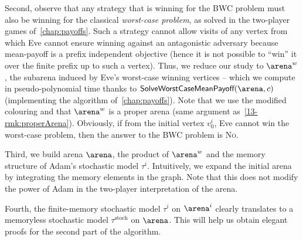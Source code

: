 Second, observe that any strategy that is winning for the BWC problem must also be winning for the classical \textit{worst-case problem}, as solved in the two-player games of~\cref{chap:payoffs}. Such a strategy cannot allow visits of any vertex from which Eve cannot ensure winning against an antagonistic adversary because mean-payoff is a prefix independent objective (hence it is not possible to ``win'' it over the finite prefix up to such a vertex). Thus, we reduce our study to $\arena^{w}$, the subarena induced by Eve's worst-case winning vertices -- which we compute in pseudo-poly\-nomial time thanks to $\textsf{SolveWorstCaseMeanPayoff}(\arena, c)$ (implementing the algorithm of~\cref{chap:payoffs}).   Note that we use the modified colouring and that $\arena^{w}$ is a proper arena (same argument as~\cref{13-rmk:properArena}). Obviously, if from the initial vertex $v_0^{i}$, Eve cannot win the worst-case problem, then the answer to the BWC problem is \textsc{No}.

Third, we build arena $\arena$, the product of $\arena^{w}$ and the memory structure of Adam's stochastic model $\tau^i$. Intuitively, we expand the initial arena by integrating the memory elements in the graph. Note that this does not modify the power of Adam in the two-player interpretation of the arena.

Fourth, the finite-memory stochastic model $\tau^{i}$ on $\arena^{i}$ clearly translates to a memoryless stochastic model $\tau^{\text{stoch}}$ on $\arena$. This will help us obtain elegant proofs for the second part of the algorithm.

